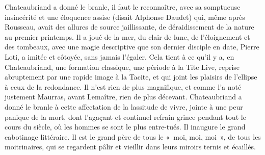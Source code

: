 \documentclass[french,twoside]{book} %
\begin{document}
Chateaubriand a donné le branle, il faut le reconnaître, avec sa somptueuse insincérité et une éloquence assise (disait Alphonse Daudet) qui, même après Rousseau, avait des allures de source jaillissante, de déraidissement de la nature au premier printemps. Il a joué de la mer, du clair de lune, de l’éloignement et des tombeaux, avec une magie descriptive que son dernier disciple en date, Pierre Loti, a imitée et côtoyée, sans jamais l’égaler. Cela tient à ce qu’il y a, en Chateaubriand, une formation classique, une période à la Tite Live, reprise abruptement par une rapide image à la Tacite, et qui joint les plaisirs de l’ellipse à ceux de la redondance. Il n’est rien de plus magnifique, et comme l’a noté justement Maurras, avant Lemaître, rien de plus décevant. Chateaubriand a donné le branle à cette affectation de la lassitude de vivre, jointe à une peur panique de la mort, dont l’agaçant et continuel refrain grince pendant tout le cours du siècle, où les hommes se sont le plus entre-tués. Il inaugure le grand cabotinage littéraire. Il est le grand père de tous le « moi, moi, moi », de tous les moitrinaires, qui se regardent pâlir et vieillir dans leurs miroirs ternis et écaillés.\par
\end{document}

